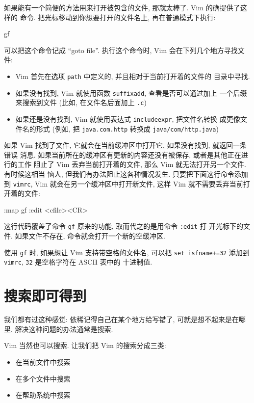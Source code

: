 如果能有一个简便的方法用来打开被包含的文件, 那就太棒了. Vim 的确提供了这样的
命令. 把光标移动到你想要打开的文件名上, 再在普通模式下执行:
\begin{vimcmd}
gf
\end{vimcmd}
可以把这个命令记成 ``goto file''. 执行这个命令时, Vim 会在下列几个地方寻找文件:
\begin{itemize}
    \item Vim 首先在选项 \texttt{path} 中定义的, 并且相对于当前打开着的文件的
        目录中寻找.
    \item 如果没有找到, Vim 就使用函数 \texttt{suffixadd}, 查看是否可以通过加上
        一个后缀来搜索到文件 (比如, 在文件名后面加上 \texttt{.c})
    \item 如果还是没有找到, Vim 就使用表达式 \texttt{includeexpr}, 把文件名转换
        成更像文件名的形式 (例如, 把 \texttt{java.com.http} 转换成
        \texttt{java/com/http.java})
\end{itemize}

如果 Vim 找到了文件, 它就会在当前缓冲区中打开它, 如果没有找到, 就返回一条错误
消息. 如果当前所在的缓冲区有更新的内容还没有被保存, 或者是其他正在进行的工作
阻止了 Vim 丢弃当前打开着的文件, 那么 Vim 就无法打开另一个文件. 有时候这相当
恼人, 但我们有办法阻止这各种情况发生. 只要把下面这行命令添加到 \texttt{vimrc},
Vim 就会在另一个缓冲区中打开新文件, 这样 Vim 就不需要丢弃当前打开着的文件:
\begin{vimcmd}
:map gf :edit <cfile><CR>
\end{vimcmd}
这行代码覆盖了命令 \texttt{gf} 原来的功能, 取而代之的是用命令 \texttt{:edit} 打
开光标下的文件. 如果文件不存在, 命令就会打开一个新的空缓冲区.

\begin{warning}
    使用 \texttt{gf} 时, 如果想让 Vim 支持带空格的文件名, 可以把 \texttt{set
    isfname+=32} 添加到 \texttt{vimrc}, \texttt{32} 是空格字符在 ASCII 表中的
    十进制值.
\end{warning}

\section{搜索即可得到}
\label{sec:search_and_you_will_find}

我们都有过这种感觉: 依稀记得自己在某个地方给写错了, 可就是想不起来是在哪里.
解决这种问题的办法通常是搜索.

Vim 当然也可以搜索. 让我们把 Vim 的搜索分成三类:
\begin{itemize}
    \item 在当前文件中搜索
    \item 在多个文件中搜索
    \item 在帮助系统中搜索
\end{itemize}

